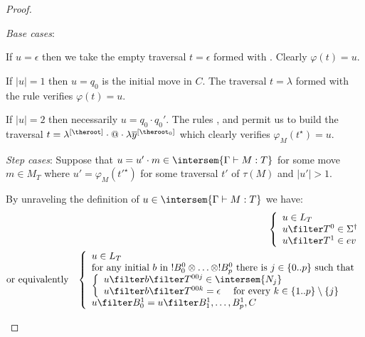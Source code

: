 \begin{proof}
\begin{enumerate}[$\bullet$]
\begin{enumerate}
    \emph{Base cases}:
    \begin{compactitem}[-]
    \item If $u=\epsilon$ then we take the empty traversal $t=\epsilon$ formed
with . Clearly $\varphi(t) = u$.
    \item If $|u|=1$ then $u=q_0$ is the initial move in $C$. The traversal $t=\lambda$ formed with the rule  verifies $\varphi(t) = u$.
    \item If $|u|=2$ then necessarily $u = q_0 \cdot q_0'$. The rules , 
and  permit us to build the traversal $t =
\lambda^{[\theroot]} \cdot @ \cdot \lambda
\overline{y}^{[\theroot_0]}$ which clearly verifies
$\varphi_M(t^\star) = u$.
    \end{compactitem}

    \emph{Step cases}: Suppose that $u = u' \cdot m \in
    \intersem{\Gamma \vdash M : T}$ for some move $m \in
    M_T$ where $u' = \varphi_M(t'^\star)$ for some traversal
    $t'$ of $\tau(M)$ and $|u'|>1$.

    By unraveling the definition of $u \in \intersem{\Gamma \vdash M : T}$ we have:
    \begin{eqnarray*}
      &&      \left\{
            \begin{array}{ll}
                u \in L_T\\
                u \filter T^0  \in \Sigma^\dagger \\
                u \filter T^1  \in  ev
            \end{array}
            \right. \\
    & \mbox{or equivalently} & \left\{
    \begin{array}{ll}
        u \in L_T \\
        \hbox{for any initial $b$ in $!B_0^0 \otimes \ldots \otimes !B_p^0$ there is $j \in \{0..p\}$ such that } \\
        \left\{\begin{array}{ll}
            u \filter b \filter T^{00j} \in \intersem{N_j} \label{eq:def_z} \\
            u \filter b \filter T^{00k} = \epsilon \quad \mbox{ for every } k\in \{1..p\}\setminus\{j\} \label{eq:b}
        \end{array}
        \right. \\
        u \filter B^1_0 = u \filter B^1_1, \ldots, B^1_p, C
    \end{array}
    \right.
    \end{eqnarray*}


\end{enumerate}
\end{enumerate}
\end{proof}
